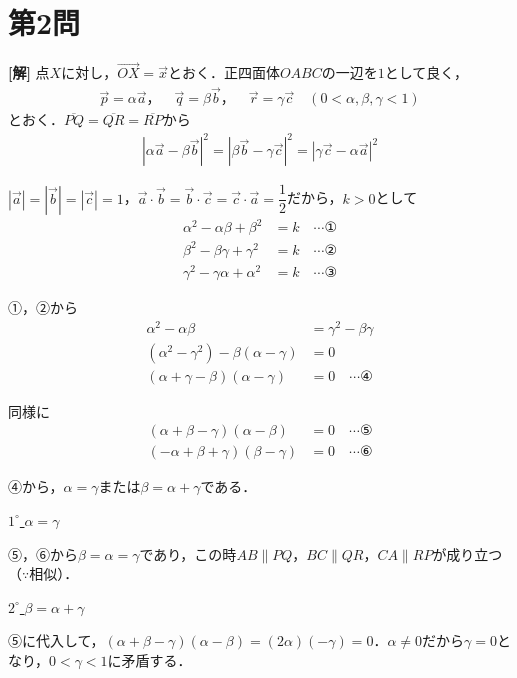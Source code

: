\documentclass[../main.tex]{subfiles}
\begin{document}
\newpage

\section*{第2問}

{\bf [解]}
点$X$に対し，$\overrightarrow{OX}=\vec x$とおく．正四面体$OABC$の一辺を$1$として良く，
\begin{align*}
  \vec p=\alpha\vec a，\quad \vec q=\beta\vec b，\quad \vec r=\gamma\vec c\quad(0<\alpha,\beta,\gamma<1)
\end{align*}
とおく．$\overline{PQ}=\overline{QR}=\overline{RP}$から
\begin{align*}
  |\alpha\vec a-\beta\vec b|^2=|\beta\vec b-\gamma\vec c|^2=|\gamma\vec c-\alpha\vec a|^2
\end{align*}

$|\vec a|=|\vec b|=|\vec c|=1$，$\vec a\cdot\vec b=\vec b\cdot\vec c=\vec c\cdot\vec a=\dfrac12$だから，$k>0$として
\begin{align*}
  \alpha^2-\alpha\beta+\beta^2&=k\quad\cdots①\\
  \beta^2-\beta\gamma+\gamma^2&=k\quad\cdots②\\
  \gamma^2-\gamma\alpha+\alpha^2&=k\quad\cdots③
\end{align*}

①，②から
\begin{align*}
  \alpha^2-\alpha\beta&=\gamma^2-\beta\gamma\\
  (\alpha^2-\gamma^2)-\beta(\alpha-\gamma)&=0\\
  (\alpha+\gamma-\beta)(\alpha-\gamma)&=0\quad\cdots④
\end{align*}

同様に
\begin{align*}
  (\alpha+\beta-\gamma)(\alpha-\beta)&=0\quad\cdots⑤\\
  (-\alpha+\beta+\gamma)(\beta-\gamma)&=0\quad\cdots⑥
\end{align*}

④から，$\alpha=\gamma$または$\beta=\alpha+\gamma$である．

\underline{$1^\circ$ $\alpha=\gamma$}

⑤，⑥から$\beta=\alpha=\gamma$であり，この時$AB\parallel PQ$，$BC\parallel QR$，$CA\parallel RP$が成り立つ（$\because$相似）．

\underline{$2^\circ$ $\beta=\alpha+\gamma$}

⑤に代入して，$(\alpha+\beta-\gamma)(\alpha-\beta)=(2\alpha)(-\gamma)=0$．$\alpha\ne0$だから$\gamma=0$となり，$0<\gamma<1$に矛盾する．
\end{document}
